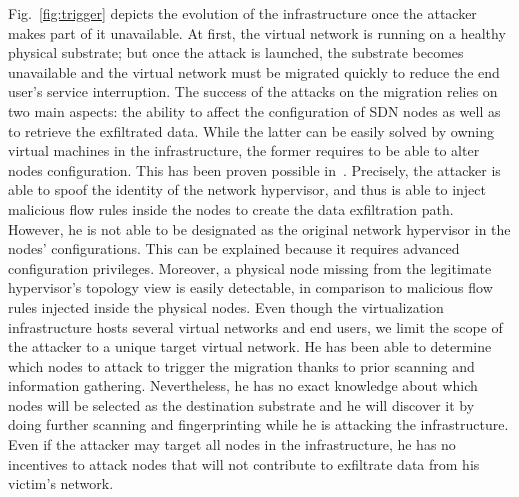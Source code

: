 \label{sec:attack_model}
Fig.~\ref{fig:trigger} depicts the evolution of the infrastructure once the attacker makes part of it unavailable. 
At first, the virtual network is running on a healthy physical substrate; but once the attack is launched, the substrate becomes unavailable and the virtual network must be migrated quickly to reduce the end user's service interruption.
The success of the attacks on the migration relies on two main aspects: the ability to affect the configuration of SDN nodes as well as  to retrieve the exfiltrated data.
While the latter can be easily solved by owning virtual machines in the infrastructure, the former requires to be able to alter nodes configuration. This has been proven possible in~\cite{Taxonomy_Hizver2015, Bokani2015, attain-Ujcich2017}.
Precisely, the attacker is able to spoof the identity of the network hypervisor, and thus is able to inject malicious flow rules inside the nodes to create the data exfiltration path. 
However, he is not able to be designated as the original network hypervisor in the nodes' configurations. 
This can be explained because it requires advanced configuration privileges. Moreover, a physical node missing from the legitimate hypervisor's topology view is easily detectable, in comparison to malicious flow rules injected inside the physical nodes.
Even though the virtualization infrastructure hosts several virtual networks and end users, we limit the scope of the attacker to a unique target virtual network. 
He has been able to determine which nodes to attack to trigger the migration thanks to prior scanning and information gathering. 
Nevertheless, he has no exact knowledge about which nodes will be selected as the destination substrate and he will discover it by doing further scanning and fingerprinting  while he is attacking the infrastructure.  
Even if the attacker may target all nodes in the infrastructure, he has no incentives to attack nodes that will not contribute to exfiltrate data from his victim's network. 

